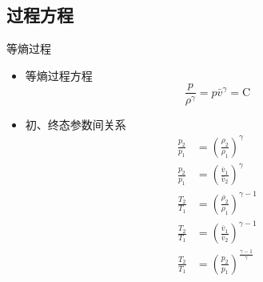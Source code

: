 \subsection{过程方程}
\begin{frame}{等熵过程}
  \begin{itemize}
    \item 等熵过程方程
      \begin{equation*}
        \frac{p}{\rho^{\gamma}}
        =
        p\bar{v}^{\gamma}
        =
        \mathrm{C}
      \end{equation*}
    \item 初、终态参数间关系
      \begin{equation*}
        \begin{aligned}
          \frac{p_{2}}{p_{1}}
           &=
           \left(\frac{\rho_{2}}{\rho_{1}}\right)^{\gamma}
           \\
           \frac{p_{2}}{p_{1}}
           &=
           \left(\frac{\bar{v}_{1}}{\bar{v}_{2}}\right)^{\gamma}
           \\
           \frac{T_{2}}{T_{1}}
           &=
           \left(\frac{\rho_{2}}{\rho_{1}}\right)^{\gamma-1}
           \\
           \frac{T_{2}}{T_{1}}
           &=
           \left(\frac{\bar{v}_{1}}{\bar{v}_{2}}\right)^{\gamma-1}
           \\
           \frac{T_{2}}{T_{1}}
           &=
           \left(\frac{p_{2}}{p_{1}}\right)^{\frac{\gamma-1}{\gamma}}
        \end{aligned}
      \end{equation*}
  \end{itemize}
\end{frame}

